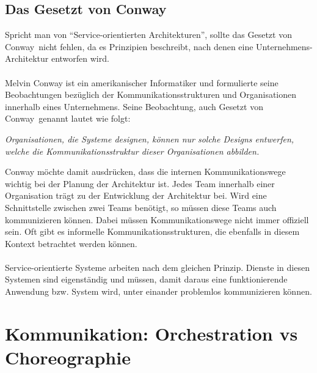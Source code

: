 \subsection{Das Gesetzt von Conway}
\label{subsec:conway}
Spricht man von "`Service-orientierten Architekturen"', sollte das \glqq Gesetzt von Conway\grqq\ nicht fehlen, da es Prinzipien beschreibt, nach denen eine Unternehmens-Architektur entworfen wird.
\\\\
Melvin Conway ist ein amerikanischer Informatiker und formulierte seine Beobachtungen bezüglich der Kommunikationsstrukturen und Organisationen innerhalb eines Unternehmens. Seine Beobachtung, auch \glqq Gesetzt von Conway\grqq\ genannt lautet wie folgt:
\begin{center}
    \textit{Organisationen, die Systeme designen, können nur solche Designs entwerfen, welche die Kommunikationsstruktur dieser Organisationen abbilden.}
\end{center}

Conway möchte damit ausdrücken, dass die internen Kommunikationswege wichtig bei der Planung der Architektur ist. Jedes Team innerhalb einer Organisation trägt zu der Entwicklung der Architektur bei. Wird eine Schnittstelle zwischen zwei Teams benötigt, so müssen diese Teams auch kommunizieren können. Dabei müssen Kommunikationswege nicht immer offiziell sein. Oft gibt es informelle Kommunikationsstrukturen, die ebenfalls in diesem Kontext betrachtet werden können.
\\\\
Service-orientierte Systeme arbeiten nach dem gleichen Prinzip. Dienste in diesen Systemen sind eigenständig und müssen, damit daraus eine funktionierende Anwendung bzw. System wird, unter einander problemlos kommunizieren können.

\section{Kommunikation: Orchestration vs Choreographie}
\label{sec:OrchestrationVsChoregraphie}


